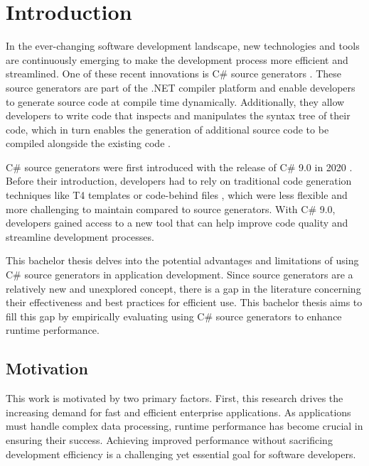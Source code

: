 \chapter{Introduction}

In the ever-changing software development landscape, new technologies and tools are continuously emerging to make the development process more efficient and streamlined. One of these recent innovations is C\# source generators \cite{Microsoft2022SourceGenerators}. These source generators are part of the .NET compiler platform \cite{Vermeir2022.NETPlatform} and enable developers to generate source code at compile time dynamically. Additionally, they allow developers to write code that inspects and manipulates the syntax tree of their code, which in turn enables the generation of additional source code to be compiled alongside the existing code \cite{Microsoft2022SourceGenerators, Slimak2022SourceSLIMAK, Franz2022TrendsCompilerbau}.

C\# source generators were first introduced with the release of C\# 9.0 in 2020 \cite{Slimak2022SourceSLIMAK}. Before their introduction, developers had to rely on traditional code generation techniques like T4 templates \cite{Syriani2018SystematicGeneration} or code-behind files \cite{Tran2010UsingGeneration}, which were less flexible and more challenging to maintain compared to source generators. With C\# 9.0, developers gained access to a new tool that can help improve code quality and streamline development processes.

This bachelor thesis delves into the potential advantages and limitations of using C\# source generators in application development. Since source generators are a relatively new and unexplored concept, there is a gap in the literature concerning their effectiveness and best practices for efficient use. This bachelor thesis aims to fill this gap by empirically evaluating using C\# source generators to enhance runtime performance.

\section{Motivation}

This work is motivated by two primary factors. First, this research drives the increasing demand for fast and efficient enterprise applications. As applications must handle complex data processing, runtime performance has become crucial in ensuring their success. Achieving improved performance without sacrificing development efficiency is a challenging yet essential goal for software developers.

